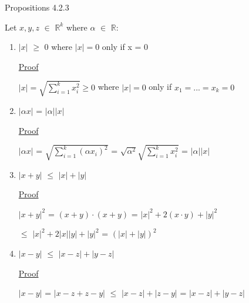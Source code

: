 \newpage

{ \color{blue} Propositions 4.2.3 } 

	\qquad Let $x,y,z$ $\in$ $\mathbb{R}^k$ where $\alpha$ $\in$ $\mathbb{R}$:
	\begin{enumerate}[label=(\alph*), leftmargin=2cm, itemsep=0.4em]
		\item $|x|$ $\geq$ 0 where $|x| = 0$ only if x = 0

			{ \color{magenta} \underline{Proof} } 
		
				$|x| = \sqrt{\sum_{i=1}^{k} x_i^2} \geq 0$ where $|x| = 0$ only if $x_1 = ... = x_k = 0$ 

		\item $|\alpha x|$ = $|\alpha| |x|$

			{ \color{magenta} \underline{Proof} } 
		
				$|\alpha x|$ = $\sqrt{\sum_{i=1}^k (\alpha x_i)^2}$
				= $\sqrt{\alpha^2} \sqrt{\sum_{i=1}^k x_i^2}$ = $|\alpha| |x|$
	
		\item $|x+y|$ $\leq$ $|x| + |y|$

			{ \color{magenta} \underline{Proof} } 
		
				$|x+y|^2$ = $(x+y) \cdot (x+y)$ = $|x|^2 + 2(x \cdot y) + |y|^2$

				$\leq$ $|x|^2 + 2|x||y| + |y|^2$ = $(|x|+|y|)^2$

		\item $|x-y|$ $\leq$ $|x-z| + |y-z|$

			{ \color{magenta} \underline{Proof} } 
		
				$|x-y|$ = $|x-z + z-y|$ $\leq$ $|x-z| + |z-y|$ = $|x-z| + |y-z|$
	\end{enumerate}

